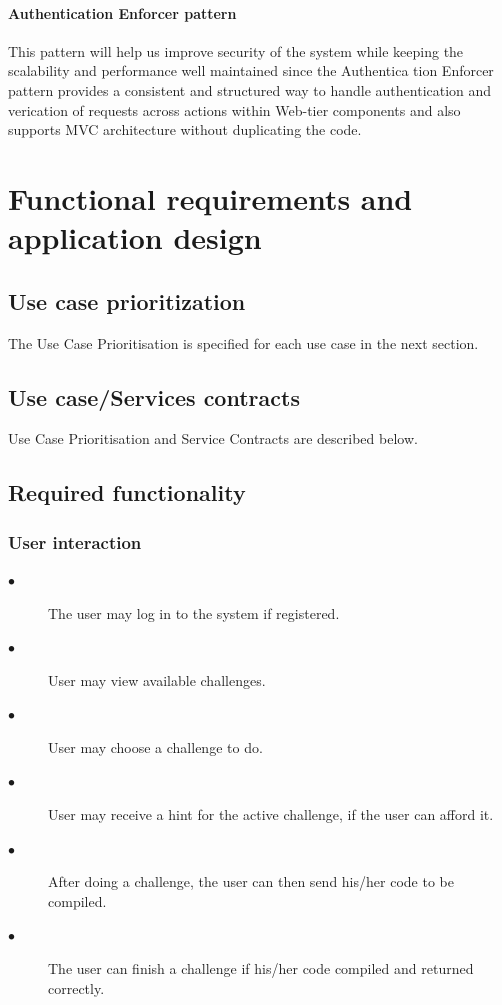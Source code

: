 \documentclass[english]{article}
\begin{document}
		\paragraph{Authentication Enforcer pattern} %
		
		This pattern will help us improve security of the system while keeping
		the scalability and performance well maintained since the Authentica
		tion Enforcer pattern provides a consistent and structured way to handle
		authentication and verication of requests across actions within Web-tier
		components and also supports MVC architecture without duplicating the
		code.	
		
		
	
	\newpage
	\section{Functional requirements and application design}
		\subsection{Use case prioritization}
		The Use Case Prioritisation is specified for each use case in the next section.
		
		\subsection{Use case/Services contracts}
		Use Case Prioritisation and Service Contracts are described below.


		\subsection{Required functionality}
		\subsubsection{User interaction}
		\begin{description}
			\item[$\bullet$] The user may log in to the system if registered.
			\item[$\bullet$] User may view available challenges.
			\item[$\bullet$] User may choose a challenge to do.
			\item[$\bullet$] User may receive a hint for the active challenge, if the user can afford it.
			\item[$\bullet$] After doing a challenge, the user can then send his/her code to be compiled.
			\item[$\bullet$] The user can finish a challenge if his/her code compiled and returned correctly.
		\end{description}
		
\end{document}
